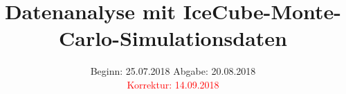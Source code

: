 

\subject{Lehrstuhlversuch E5b}
\title{Datenanalyse mit IceCube-Monte-Carlo-Simulationsdaten}
\date{
	Beginn: 25.07.2018
	\hspace{3em}
	Abgabe: 20.08.2018\\
	\vspace{1cm}
	\textcolor{red}{Korrektur: 14.09.2018}
}


	
	\maketitle
	\newpage
	
	
	
	
	
	
	
	\printbibliography
	

